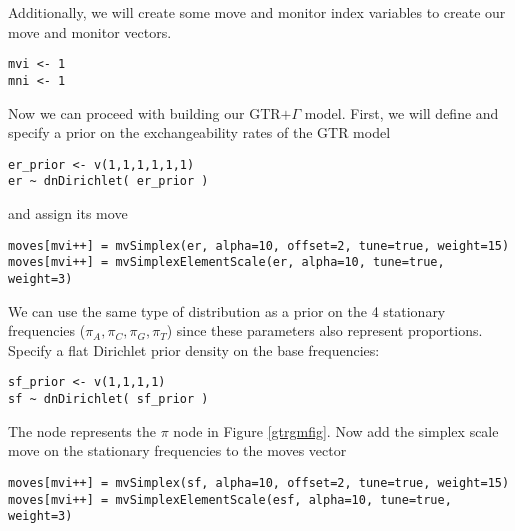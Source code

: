 Additionally, we will create some move and monitor index variables to create our move and monitor vectors.

{\tt \begin{snugshade*}
\begin{lstlisting}
mvi <- 1
mni <- 1
\end{lstlisting}
\end{snugshade*}}

Now we can proceed with building our GTR$+\Gamma$ model.
First, we will define and specify a prior on the exchangeability rates of the GTR model

{\tt \begin{snugshade*}
\begin{lstlisting}
er_prior <- v(1,1,1,1,1,1) 
er ~ dnDirichlet( er_prior )
\end{lstlisting}
\end{snugshade*}}

and assign its move

{\tt \begin{snugshade*}
\begin{lstlisting}
moves[mvi++] = mvSimplex(er, alpha=10, offset=2, tune=true, weight=15)
moves[mvi++] = mvSimplexElementScale(er, alpha=10, tune=true, weight=3) 
\end{lstlisting}
\end{snugshade*}}

We can use the same type of distribution as a prior on the 4 stationary frequencies ($\pi_A, \pi_C, \pi_G, \pi_T$) since these parameters also represent proportions. 
Specify a flat Dirichlet prior density on the base frequencies:
{\tt \begin{snugshade*}
\begin{lstlisting}
sf_prior <- v(1,1,1,1) 
sf ~ dnDirichlet( sf_prior )
\end{lstlisting}
\end{snugshade*}}

The node  represents the $\pi$ node in Figure \ref{gtrgmfig}.
Now add the simplex scale move on the stationary frequencies to the moves vector

{\tt \small \begin{snugshade*}
\begin{lstlisting}
moves[mvi++] = mvSimplex(sf, alpha=10, offset=2, tune=true, weight=15)
moves[mvi++] = mvSimplexElementScale(esf, alpha=10, tune=true, weight=3) 
\end{lstlisting}
\end{snugshade*}}

